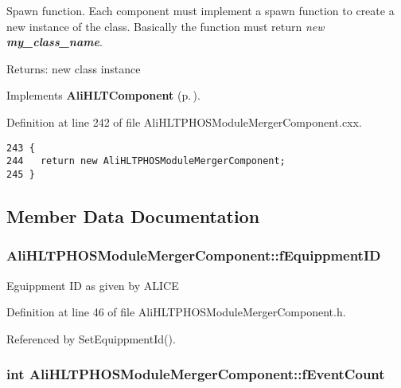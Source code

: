 Spawn function. Each component must implement a spawn function to create a new instance of the class. Basically the function must return {\em new {\bf my\_\-class\_\-name}\/}. \begin{Desc}
\item[Returns:]new class instance \end{Desc}


Implements {\bf Ali\-HLTComponent} {\rm (p.\,\pageref{classAliHLTComponent_a13})}.

Definition at line 242 of file Ali\-HLTPHOSModule\-Merger\-Component.cxx.

\footnotesize\begin{verbatim}243 {
244   return new AliHLTPHOSModuleMergerComponent;
245 }
\end{verbatim}\normalsize 




\subsection{Member Data Documentation}
\subsubsection{ {\bf Ali\-HLTPHOSModule\-Merger\-Component::f\-Equippment\-ID}\hspace{0.3cm}{\tt  [private]}}\label{classAliHLTPHOSModuleMergerComponent_r1}


Eguippment ID as given by ALICE 

Definition at line 46 of file Ali\-HLTPHOSModule\-Merger\-Component.h.

Referenced by Set\-Equippment\-Id().
\subsubsection{\setlength{\rightskip}{0pt plus 5cm}int {\bf Ali\-HLTPHOSModule\-Merger\-Component::f\-Event\-Count}\hspace{0.3cm}{\tt  [private]}}\label{classAliHLTPHOSModuleMergerComponent_r0}



